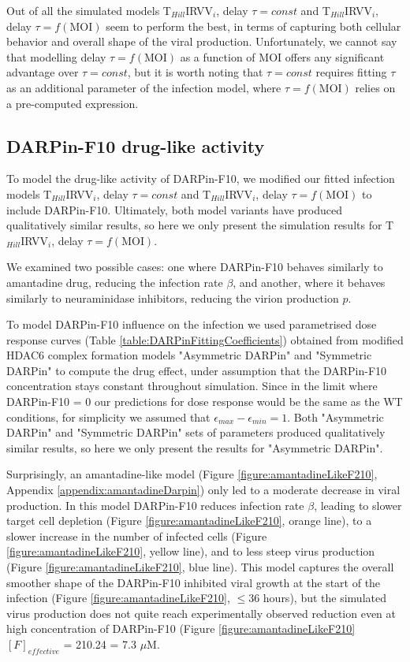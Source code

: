 Out of all the simulated models T$_{Hill}$IRVV$_i$, delay $\tau = const$ and T$_{Hill}$IRVV$_i$, delay $\tau = f(\text{MOI})$ seem to perform the best, in terms of capturing both cellular behavior and overall shape of the viral production. Unfortunately, we cannot say that modelling delay $\tau = f(\text{MOI})$ as a function of MOI offers any significant advantage over $\tau = const$, but it is worth noting that $\tau = const$ requires fitting $\tau$ as an additional parameter of the infection model, where $\tau = f(\text{MOI})$ relies on a pre-computed expression.

\subsection{DARPin-F10 drug-like activity}

To model the drug-like activity of DARPin-F10, we modified our fitted infection models T$_{Hill}$IRVV$_i$, delay $\tau = const$ and T$_{Hill}$IRVV$_i$, delay $\tau = f(\text{MOI})$ to include DARPin-F10. Ultimately, both model variants have produced qualitatively similar results, so here we only present the simulation results for T$_{Hill}$IRVV$_i$, delay $\tau = f(\text{MOI})$.

We examined two possible cases: one where DARPin-F10 behaves similarly to amantadine drug, reducing the infection rate $\beta$, and another, where it behaves similarly to neuraminidase inhibitors, reducing the virion production $p$.

To model DARPin-F10 influence on the infection we used parametrised dose response curves (Table \ref{table:DARPinFittingCoefficients}) obtained from modified HDAC6 complex formation models "Asymmetric DARPin" and "Symmetric DARPin" to compute the drug effect, under assumption that the DARPin-F10 concentration stays constant throughout simulation. Since in the limit where DARPin-F10 = 0 our predictions for dose response would be the same as the WT conditions, for simplicity we assumed that $\epsilon_{max} - \epsilon_{min} = 1$. Both "Asymmetric DARPin" and "Symmetric DARPin"  sets of parameters produced qualitatively similar results, so here we only present the results for "Asymmetric DARPin".

Surprisingly, an amantadine-like model (Figure \ref{figure:amantadineLikeF210}, Appendix \ref{appendix:amantadineDarpin}) only led to a moderate decrease in viral production. In this model DARPin-F10 reduces infection rate $\beta$, leading to slower target cell depletion (Figure \ref{figure:amantadineLikeF210}, orange line), to a slower increase in the number of infected cells (Figure \ref{figure:amantadineLikeF210}, yellow line), and to less steep virus production (Figure \ref{figure:amantadineLikeF210}, blue line). This model captures the overall smoother shape of the DARPin-F10 inhibited viral growth at the start of the infection (Figure \ref{figure:amantadineLikeF210}, $\le 36$ hours), but the simulated virus production does not quite reach experimentally observed reduction even at high concentration of DARPin-F10 (Figure \ref{figure:amantadineLikeF210} $[F]_{effective}$ = 210.24 = 7.3 $\mu$M.

